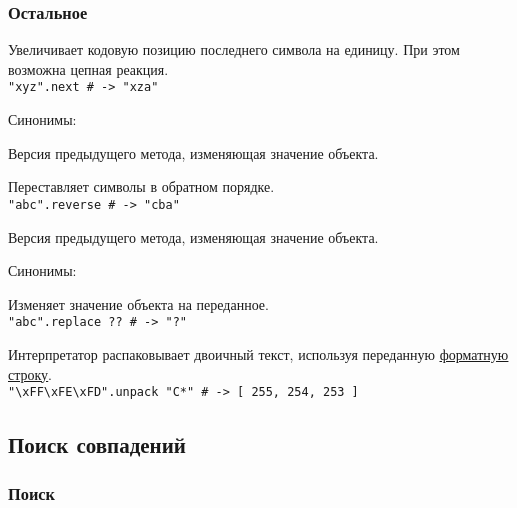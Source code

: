 \subsubsection*{Остальное}

\begin{methodlist}

  Увеличивает кодовую позицию последнего символа на единицу. При этом возможна цепная реакция.
  \\\verb!"xyz".next # -> "xza"!

  Синонимы: 

  Версия предыдущего метода, изменяющая значение объекта.

  Переставляет символы в обратном порядке.
  \\\verb!"abc".reverse # -> "cba"!

  Версия предыдущего метода, изменяющая значение объекта.

  Синонимы: 

  Изменяет значение объекта на переданное.
  \\\verb!"abc".replace ?? # -> "?"!

  Интерпретатор распаковывает двоичный текст, используя переданную \hyperlink{apppack}{\underline{форматную строку}}.
  \\\verb!"\xFF\xFE\xFD".unpack "C*" # -> [ 255, 254, 253 ]!
\end{methodlist}

\subsection*{Поиск совпадений}

\subsubsection*{Поиск}

